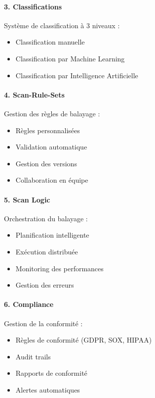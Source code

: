 \documentclass[12pt,a4paper]{article}
\begin{document}
\paragraph{3. Classifications}
Système de classification à 3 niveaux :
\begin{itemize}
    \item Classification manuelle
    \item Classification par Machine Learning
    \item Classification par Intelligence Artificielle
\end{itemize}

\paragraph{4. Scan-Rule-Sets}
Gestion des règles de balayage :
\begin{itemize}
    \item Règles personnalisées
    \item Validation automatique
    \item Gestion des versions
    \item Collaboration en équipe
\end{itemize}

\paragraph{5. Scan Logic}
Orchestration du balayage :
\begin{itemize}
    \item Planification intelligente
    \item Exécution distribuée
    \item Monitoring des performances
    \item Gestion des erreurs
\end{itemize}

\paragraph{6. Compliance}
Gestion de la conformité :
\begin{itemize}
    \item Règles de conformité (GDPR, SOX, HIPAA)
    \item Audit trails
    \item Rapports de conformité
    \item Alertes automatiques
\end{itemize}
\end{document}
